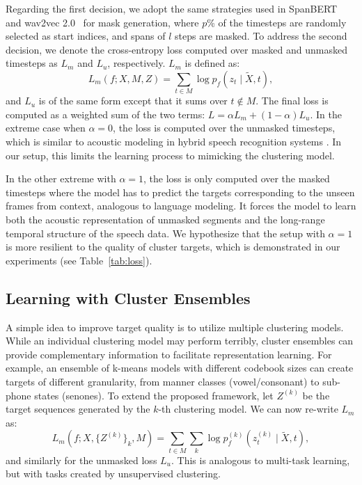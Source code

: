Regarding the first decision, we adopt the same strategies used in SpanBERT~\cite{joshi2020spanbert} and wav2vec 2.0~\cite{baevski2020wav2vec} for mask generation, where $p$\% of the timesteps are randomly selected as start indices, and spans of $l$ steps are masked. To address the second decision, we denote the cross-entropy loss computed over masked and unmasked timesteps as $L_m$ and $L_u$, respectively. $L_m$ is defined as:
\begin{equation}
    L_m(f; X, M, Z) = \sum_{t \in M} \log p_f(z_t \mid \tilde{X}, t),
\end{equation}
and $L_u$ is of the same form except that it sums over $t \not\in M$.
The final loss is computed as a weighted sum of the two terms: $L = \alpha L_m + (1-\alpha)L_u$. In the extreme case when $\alpha = 0$, the loss is computed over the unmasked timesteps, which is similar to acoustic modeling in hybrid speech recognition systems \cite{young1996large, abdel2012applying, povey2005discriminative, bourlard2012connectionist}. In our setup, this limits the learning process to mimicking the clustering model. 

In the other extreme with $\alpha=1$, the loss is only computed over the masked timesteps where the model has to predict the targets corresponding to the unseen frames from context, analogous to language modeling. It forces the model to learn both the acoustic representation of unmasked segments and the long-range temporal structure of the speech data. We hypothesize that the setup with $\alpha=1$ is more resilient to the quality of cluster targets, which is demonstrated in our experiments (see Table~\ref{tab:loss}).


\subsection{Learning with Cluster Ensembles}
A simple idea to improve target quality is to utilize multiple clustering models. While an individual clustering model may perform terribly, cluster ensembles can provide complementary information to facilitate representation learning. For example, an ensemble of k-means models with different codebook sizes can create targets of different granularity, from manner classes (vowel/consonant) to sub-phone states (senones). 
To extend the proposed framework, let $Z^{(k)}$ be the target sequences generated by the $k$-th clustering model. We can now re-write $L_m$ as:
\begin{equation}
    L_m(f; X, \{ Z^{(k)} \}_k, M) = 
    \sum_{t \in M} \sum_{k} \log p_f^{(k)}(z_t^{(k)} \mid \tilde{X}, t), \label{eq:our_obj}
\end{equation}
and similarly for the unmasked loss $L_u$. This is analogous to multi-task learning, but with tasks created by unsupervised clustering.

